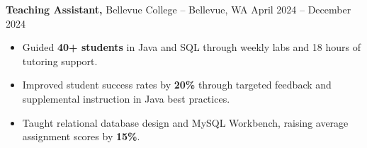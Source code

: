 \documentclass[11pt]{article}
\begin{document}
\textbf{Teaching Assistant,} {Bellevue College} -- Bellevue, WA \hfill April 2024 -- December 2024
\vspace{-9pt}
\begin{itemize}
  \item Guided \textbf{40+ students} in Java and SQL through weekly labs and 18 hours of tutoring support.
  \item Improved student success rates by \textbf{20\%} through targeted feedback and supplemental instruction in Java best practices.
  \item Taught relational database design and MySQL Workbench, raising average assignment scores by \textbf{15\%}.
\end{itemize}

\end{document}
